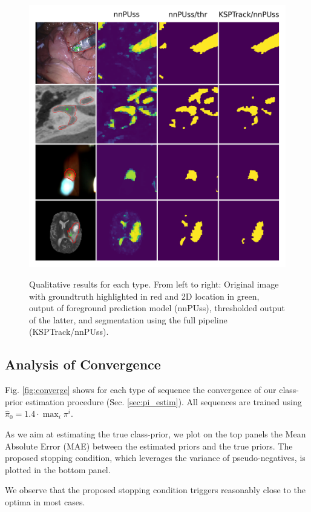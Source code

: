 \begin{figure}[t]
\caption{Qualitative results for each type. From left to right: Original image with groundtruth highlighted in red and 2D location in green, output of foreground prediction model (nnPUss), thresholded output of the latter, and segmentation using the full pipeline (KSPTrack/nnPUss).}
\centering
    \includegraphics[width=.6\textwidth]{pics/prevs.png}
\label{fig:prevs}
\end{figure}

\subsection{Analysis of Convergence}
\label{sec:convergence}

Fig. \ref{fig:converge} shows for each type of sequence the convergence of our class-prior estimation procedure (Sec. \ref{sec:pi_estim}).
All sequences are trained using $\hat\pi_{0}= 1.4 \cdot \max_i{\pi^i}$.

As we aim at estimating the true class-prior, we plot on the top panels the Mean Absolute Error (MAE) between the estimated priors and the true priors.
The proposed stopping condition, which leverages the variance of pseudo-negatives, is plotted in the bottom panel.

We observe that the proposed stopping condition triggers reasonably close to the optima in most cases.


